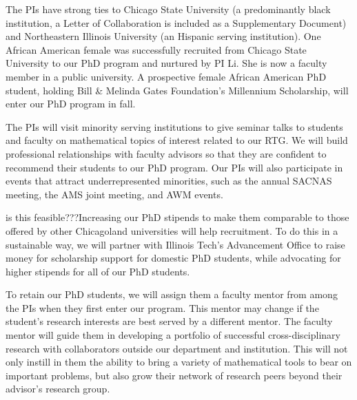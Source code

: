 \documentclass[11pt]{NSFamsart}
\begin{document}



The PIs have strong ties to Chicago State University (a predominantly black institution, a Letter of Collaboration is included as a Supplementary Document) and Northeastern Illinois University (an Hispanic serving institution). One African American female was successfully recruited from Chicago State University to our PhD program and nurtured by PI Li.  She is now a faculty member in a public university. A prospective female  African American  PhD student, holding Bill \& Melinda Gates Foundation's Millennium Scholarship, will enter our PhD program in fall. 


The PIs will visit minority serving institutions to give seminar talks to students and faculty on mathematical topics of interest related to our RTG.  We will build professional relationships with faculty advisors so that they are confident to recommend their students to our PhD program.  Our PIs will also participate in events that attract underrepresented minorities, such as the annual SACNAS meeting, the AMS joint meeting, and AWM events.

{\color{red}is this feasible???}Increasing our PhD stipends to make them comparable to those offered by other Chicagoland universities will help recruitment. To do this in a sustainable way, we will partner with Illinois Tech's Advancement Office to raise money for scholarship support for domestic PhD students, while advocating for higher stipends for all of our PhD students.

To retain our PhD students, we will assign them a faculty mentor from among the PIs when they first enter our program.  This mentor may change if the student's research interests are best served by a different mentor.  The faculty mentor will guide them in developing a portfolio of successful cross-disciplinary research with collaborators outside our department and institution.  This will not only instill in them the ability to bring a variety of mathematical tools to bear on important problems, but also grow their network of research peers beyond their advisor's research group.


\end{document}
